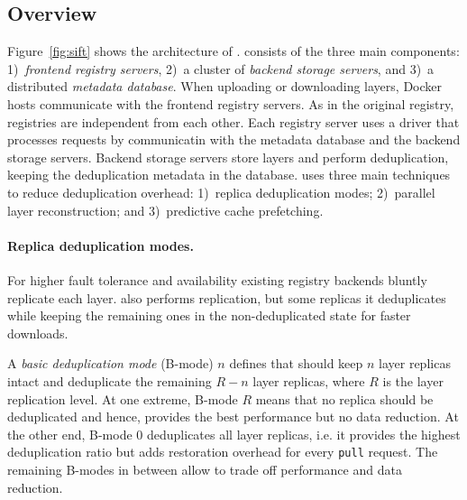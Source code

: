 \subsection{Overview}
\label{sec:overview}





Figure~\ref{fig:sift} shows the architecture of \sysname.
%
\sysname consists of the three main components: 1)~\emph{frontend registry
servers}, 2)~a cluster of \emph{backend storage servers}, and 3)~a distributed
\emph{metadata database}. 
%
When uploading or downloading layers, Docker hosts communicate with the
frontend registry servers.
%
As in the original registry, \sysname registries are independent from each
other.
%
Each registry server uses a \sysname driver that processes requests by
communicatin with the metadata database and the backend storage servers.
%
Backend storage servers store
layers  and perform deduplication, keeping the deduplication metadata in the
database.
%
%
%
\sysname uses three main techniques to reduce deduplication overhead:
1)~replica deduplication modes; 2)~parallel layer reconstruction; and
3)~predictive cache prefetching.




\paragraph{Replica deduplication modes.}
%
For higher fault tolerance and availability existing registry backends bluntly
replicate  each layer.
%
\sysname also performs replication, but some replicas it deduplicates while
keeping the remaining ones in the non-deduplicated state for faster downloads.

A \emph{basic deduplication mode} (B-mode) $n$ defines that \sysname should
keep $n$ layer replicas intact and deduplicate the remaining $R-n$ layer
replicas, where $R$ is the layer replication level.
%
%
At one extreme, B-mode $R$ means that no replica should be deduplicated and
hence, provides the best performance but no data reduction.
%
At the other end, B-mode $0$ deduplicates all layer replicas, i.e. it provides
the highest deduplication ratio but adds restoration overhead for every
\texttt{pull} request.
%
The remaining B-modes in between allow to trade off performance and data
reduction.
%

